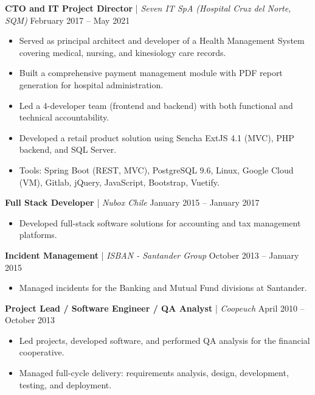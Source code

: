 \documentclass[11pt,a4paper]{article}
\begin{document}
\vspace{8pt}

\textbf{CTO and IT Project Director} | \textit{Seven IT SpA (Hospital Cruz del Norte, SQM)} \hfill February 2017 -- May 2021 \\
\begin{itemize}[noitemsep, topsep=0pt]
    \item Served as principal architect and developer of a Health Management System covering medical, nursing, and kinesiology care records.
    \item Built a comprehensive payment management module with PDF report generation for hospital administration.
    \item Led a 4-developer team (frontend and backend) with both functional and technical accountability.
    \item Developed a retail product solution using Sencha ExtJS 4.1 (MVC), PHP backend, and SQL Server.
    \item Tools: Spring Boot (REST, MVC), PostgreSQL 9.6, Linux, Google Cloud (VM), Gitlab, jQuery, JavaScript, Bootstrap, Vuetify.
\end{itemize}

\vspace{8pt}

\textbf{Full Stack Developer} | \textit{Nubox Chile} \hfill January 2015 -- January 2017 \\
\begin{itemize}[noitemsep, topsep=0pt]
    \item Developed full-stack software solutions for accounting and tax management platforms.
\end{itemize}

\vspace{8pt}

\textbf{Incident Management} | \textit{ISBAN - Santander Group} \hfill October 2013 -- January 2015 \\
\begin{itemize}[noitemsep, topsep=0pt]
    \item Managed incidents for the Banking and Mutual Fund divisions at Santander.
\end{itemize}

\vspace{8pt}

\textbf{Project Lead / Software Engineer / QA Analyst} | \textit{Coopeuch} \hfill April 2010 -- October 2013 \\
\begin{itemize}[noitemsep, topsep=0pt]
    \item Led projects, developed software, and performed QA analysis for the financial cooperative.
    \item Managed full-cycle delivery: requirements analysis, design, development, testing, and deployment.
\end{itemize}
\end{document}
